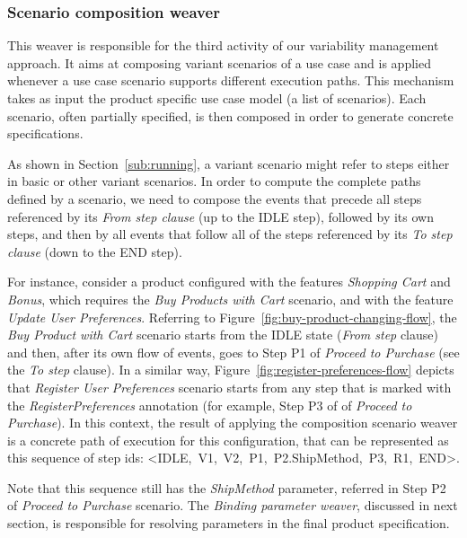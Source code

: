 \documentclass{acm_proc_article-sp}
\begin{document}

\subsubsection{Scenario composition weaver}\label{sub:sc-weaver}

This weaver is responsible for the third activity of our variability management 
approach. It aims at composing variant scenarios of a use case and is applied whenever a use case scenario supports different execution paths.
This mechanism takes as input the product specific use case model (a list of scenarios). Each scenario, often partially specified, is then composed in order to generate concrete specifications.

As shown in Section~\ref{sub:running}, a variant scenario 
might refer to steps either in basic or other variant scenarios. In order
to compute the complete paths defined by a scenario, we need to compose the events that precede all steps referenced by its \emph{From step
clause} (up to the IDLE step), followed by its own steps, and then by all
events that follow all of the steps referenced by its \emph{To step clause} (down to the END step). 

For instance, consider a product configured with the features \emph{Shopping Cart} and \emph{Bonus}, which requires the \emph{Buy Products with Cart} scenario, and with the feature \emph{Update User Preferences}. Referring to Figure~\ref{fig:buy-product-changing-flow}, the  \emph{Buy Product with Cart} scenario starts from the IDLE state (\emph{From step} clause) and then, after its own flow of events, goes to Step P1 of \emph{Proceed to Purchase} (see the \emph{To step} clause). In a similar way, Figure~\ref{fig:register-preferences-flow} depicts that \emph{Register User Preferences} scenario starts from any step that is marked with the \emph{RegisterPreferences} annotation (for example, Step P3 of of \emph{Proceed to Purchase}). In this context, the result of applying the composition scenario weaver is a concrete path of execution for this configuration, that can be represented as this sequence of step ids: \mbox{<IDLE, V1, V2, P1, P2.ShipMethod, P3, R1, END>}.

Note that this sequence still has  the \emph{ShipMethod} parameter, 
referred in Step P2 of \emph{Proceed to Purchase} scenario. The \emph{Binding parameter weaver}, discussed in next section, is responsible for resolving parameters in the final 
product specification.  
\end{document}
